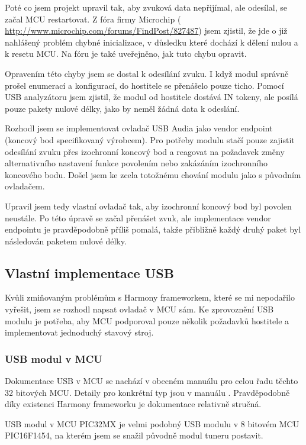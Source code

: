 Poté co jsem projekt upravil tak, aby zvuková data nepřijímal, ale odesílal, se začal MCU restartovat. Z fóra firmy Microchip ( \url{http://www.microchip.com/forums/FindPost/827487}) jsem zjistil, že jde o již nahlášený problém chybné inicializace, v důsledku které dochází k dělení nulou a k resetu MCU. Na fóru je také uveřejněno, jak tuto chybu opravit.

Opravením této chyby jsem se dostal k odesílání zvuku. I když modul správně prošel enumerací a konfigurací, do hostitele se přenášelo pouze ticho. Pomocí USB analyzátoru jsem zjistil, že modul od hostitele dostává IN tokeny, ale posílá pouze pakety nulové délky, jako by neměl žádná data k odeslání. 

Rozhodl jsem se implementovat ovladač USB Audia jako vendor endpoint (koncový bod specifikovaný výrobcem). Pro potřeby modulu stačí pouze zajistit odesílání zvuku přes izochronní koncový bod a reagovat na požadavek změny alternativního nastavení funkce povolením nebo zakázáním izochronního koncového bodu. Došel jsem ke zcela totožnému chování modulu jako s původním ovladačem.

Upravil jsem tedy vlastní ovladač tak, aby izochronní koncový bod byl povolen neustále. Po této úpravě se začal přenášet zvuk, ale implementace vendor endpointu je pravděpodobně příliš pomalá, takže přibližně každý druhý paket byl následován paketem nulové délky.


\subsection{Vlastní implementace USB}
Kvůli zmiňovaným problémům s Harmony frameworkem, které se mi nepodařilo vyřešit, jsem se rozhodl napsat ovladač v MCU sám. Ke zprovoznění USB modulu je potřeba, aby MCU podporoval pouze několik požadavků hostitele a implementovat jednoduchý stavový stroj.

\subsubsection{USB modul v MCU}
Dokumentace USB v MCU se nachází v obecném manuálu \cite{pic-usb} pro celou řadu těchto 32 bitových MCU. Detaily pro konkrétní typ jsou v manuálu \cite{pic}. Pravděpodobně díky existenci Harmony frameworku je dokumentace relativně stručná.

USB modul v MCU PIC32MX je velmi podobný USB modulu v 8 bitovém MCU PIC16F1454, na kterém jsem se snažil původně modul tuneru postavit. 

